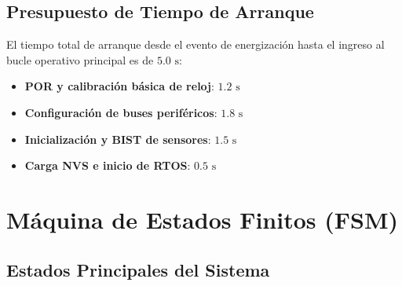\subsection{Presupuesto de Tiempo de Arranque}

El tiempo total de arranque desde el evento de energización hasta el ingreso al bucle operativo principal es de $5.0\text{ s}$:

\begin{itemize}[leftmargin=*]
    \item \textbf{POR y calibración básica de reloj}: $1.2\text{ s}$
    \item \textbf{Configuración de buses periféricos}: $1.8\text{ s}$
    \item \textbf{Inicialización y BIST de sensores}: $1.5\text{ s}$
    \item \textbf{Carga NVS e inicio de RTOS}: $0.5\text{ s}$
\end{itemize}

\section{Máquina de Estados Finitos (FSM)}

\subsection{Estados Principales del Sistema}


